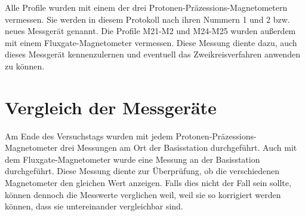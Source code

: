 Alle Profile wurden mit einem der drei Protonen-Präzessions-Magnetometern vermessen. Sie werden in diesem Protokoll nach ihren Nummern 1 und 2 bzw. neues Messgerät genannt. Die Profile M21-M2 und M24-M25 wurden außerdem mit einem Fluxgate-Magnetometer vermessen. Diese Messung diente dazu, auch dieses Messgerät kennenzulernen und eventuell das Zweikreisverfahren anwenden zu können.

\section{Vergleich der Messgeräte}

Am Ende des Versuchstags wurden mit jedem Protonen-Präzessions-Magnetometer drei Messungen am Ort der Basisstation durchgeführt. Auch mit dem Fluxgate-Magnetometer wurde eine Messung an der Basisstation durchgeführt. Diese Messung diente zur Überprüfung, ob die verschiedenen Magnetometer den gleichen Wert anzeigen. Falls dies nicht der Fall sein sollte, können dennoch die Messwerte verglichen weil, weil sie so korrigiert werden können, dass sie untereinander vergleichbar sind.